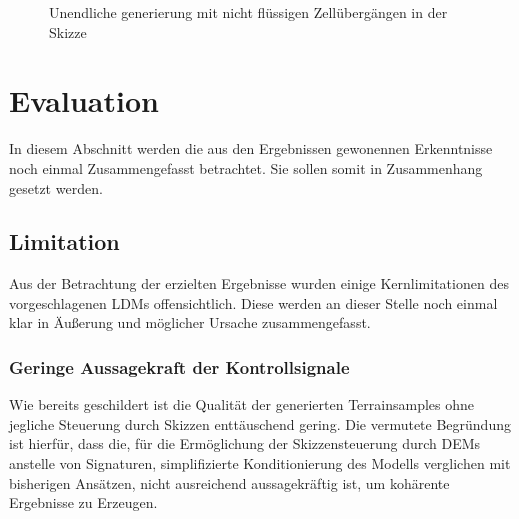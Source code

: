 \begin{figure}[htbp]
    \centering

    \vspace{-8pt}

    \caption{Unendliche generierung mit nicht flüssigen Zellübergängen in der Skizze}
    \label{fig:disconnected}
\end{figure}


\section{Evaluation}

In diesem Abschnitt werden die aus den Ergebnissen gewonennen Erkenntnisse noch einmal Zusammengefasst betrachtet. Sie sollen somit in Zusammenhang gesetzt werden.  

\subsection{Limitation}

Aus der Betrachtung der erzielten Ergebnisse wurden einige Kernlimitationen des vorgeschlagenen LDMs offensichtlich. Diese werden an dieser Stelle noch einmal klar in Äußerung und möglicher Ursache zusammengefasst.

\subsubsection{Geringe Aussagekraft der Kontrollsignale}

Wie bereits geschildert ist die Qualität der generierten Terrainsamples ohne jegliche Steuerung durch Skizzen enttäuschend gering. Die vermutete Begründung ist hierfür, dass die, für die Ermöglichung der Skizzensteuerung durch DEMs anstelle von Signaturen, simplifizierte Konditionierung des Modells verglichen mit bisherigen Ansätzen, nicht ausreichend aussagekräftig ist, um kohärente Ergebnisse zu Erzeugen. 


